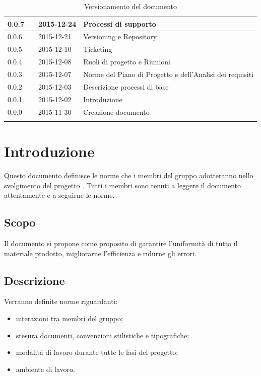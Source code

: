 \documentclass[12pt,a4paper]{article}
\begin{document}
\begin{center}
\begin{longtable}[H]{p{} p{} p{} p{}}
		0.0.7 & \NDC & 2015-12-24 & Processi di supporto \\*
		\midrule
		0.0.6 & \AVI & 2015-12-21 & Versioning e Repository \\*
		\midrule
		0.0.5 & \AVE & 2015-12-10 & Ticketing \\*
		\midrule
		0.0.4 & \AVE & 2015-12-08 & Ruoli di progetto e Riunioni \\*
		\midrule
		0.0.3 & \AVI & 2015-12-07 & Norme del Piano di Progetto e dell'Analisi dei requisiti \\*
		\midrule
		0.0.2 & \AVI & 2015-12-03 & Descrizione processi di base \\*
		\midrule 
		0.0.1 & \NDC & 2015-12-02 & Introduzione \\*
		\midrule
		0.0.0 & \NDC & 2015-11-30 & Creazione documento \\*
		\bottomrule
		\caption{Versionamento del documento}
		\label{tabVers1}
	\end{longtable}
\end{center}

\newpage
\tableofcontents
\newpage
\listoftables
\listoffigures
\newpage

\section{Introduzione}
Questo documento definisce le norme che i membri del gruppo \nomeGruppo{} adotteranno nello svolgimento del progetto \prjL. Tutti i membri sono tenuti a leggere il documento attentamente e a seguirne le norme.

\subsection{Scopo}
Il documento si propone come proposito di garantire l'uniformità di tutto il materiale prodotto, migliorarne l'efficienza e ridurne gli errori.

\subsection{Descrizione}
Verranno definite norme riguardanti:
\begin{itemize}
	\item interazioni tra membri del gruppo;
	\item stesura documenti, convenzioni stilistiche e tipografiche;
	\item modalità di lavoro durante tutte le fasi del progetto;
	\item ambiente di lavoro.
\end{itemize}
\end{document}
